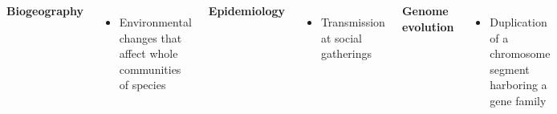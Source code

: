 \begin{frame}[c,label=violations]

    \begin{columns}


        \begin{minipage}[c][\frametextheight][c]{0.95\columnwidth}
            \raggedright
            \textbf{Biogeography}
            \begin{itemize}
                \item Environmental changes that affect whole communities of species
            \end{itemize}

            \textbf{Epidemiology}
            \begin{itemize}
                \item Transmission at social gatherings
            \end{itemize}

            \textbf{Genome evolution}
            \begin{itemize}
                \item Duplication of a chromosome segment harboring a gene family
            \end{itemize}


            \bigskip
        \end{minipage}


        \begin{minipage}[c][\frametextheight][c]{\columnwidth}
            \centering
            \resizebox{0.8\columnwidth}{!}{%
                
            }
        \end{minipage}
    \end{columns}

\end{frame}
